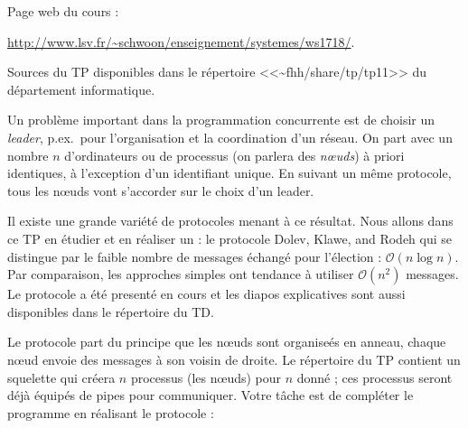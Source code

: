 \documentclass[11pt]{article}
\newcommand{\numtd}{11}
\newcommand{\titretd}{Élection d'un leader}
\begin{document}
\entete{\numtd}{\titretd}

Page web du cours :                                                                                                                                                                                                                                            
\begin{center}
\url{http://www.lsv.fr/~schwoon/enseignement/systemes/ws1718/}.
\end{center}

Sources du TP disponibles dans le répertoire
<<\textasciitilde{}fhh/share/tp/tp11>> du département informatique.

Un problème important dans la programmation concurrente est de choisir un
\emph{leader}, p.ex.\ pour l'organisation et la coordination d'un réseau. On
part avec un nombre $n$ d'ordinateurs ou de processus (on parlera des
\emph{nœuds}) à priori identiques, à l'exception d'un identifiant unique. En
suivant un même protocole, tous les nœuds vont s'accorder sur le choix d'un
leader.

Il existe une grande variété de protocoles menant à ce résultat.  Nous allons
dans ce TP en étudier et en réaliser un : le protocole Dolev, Klawe, and Rodeh
qui se distingue par le faible nombre de messages échangé pour l'élection :
$\mathcal{O}(n\log n)$. Par comparaison, les approches simples ont tendance à
utiliser $\mathcal{O}(n^2)$ messages.  Le protocole a été presenté en cours et
les diapos explicatives sont aussi disponibles dans le répertoire du TD.

Le protocole part du principe que les nœuds sont organiseés en anneau, chaque
nœud envoie des messages à son voisin de droite.  Le répertoire du TP contient
un squelette qui créera $n$ processus (les nœuds) pour $n$ donné ; ces processus
seront déjà équipés de pipes pour communiquer. Votre tâche est de compléter le
programme en réalisant le protocole :
\end{document}
